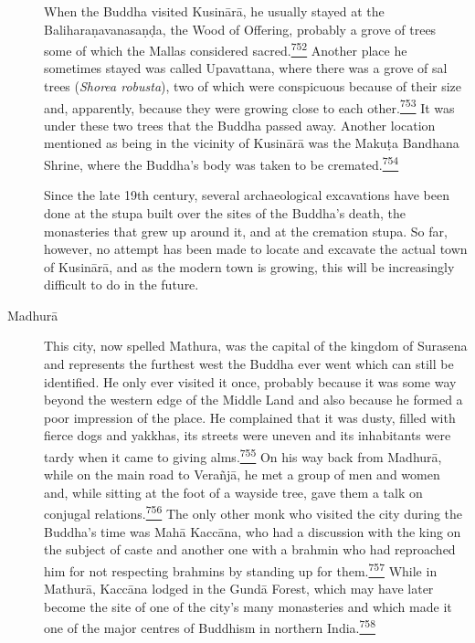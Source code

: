 \begin{description}
When the Buddha visited Kusinārā, he usually stayed at the
Baliharaṇavanasaṇḍa, the Wood of Offering, probably a grove of trees
some of which the Mallas considered
sacred.\label{footprints_split_019.html_fnref752}\hyperref[footprints_split_025.htmlux5cux23fn752]{\textsuperscript{752}}
Another place he sometimes stayed was called Upavattana, where there was
a grove of sal trees (\emph{Shorea robusta}), two of which were
conspicuous because of their size and, apparently, because they were
growing close to each
other.\label{footprints_split_019.html_fnref753}\hyperref[footprints_split_025.htmlux5cux23fn753]{\textsuperscript{753}}
It was under these two trees that the Buddha passed away. Another
location mentioned as being in the vicinity of Kusinārā was the Makuṭa
Bandhana Shrine, where the Buddha's body was taken to be
cremated.\label{footprints_split_019.html_fnref754}\hyperref[footprints_split_025.htmlux5cux23fn754]{\textsuperscript{754}}

Since the late 19{th} century, several archaeological excavations have
been done at the stupa built over the sites of the Buddha's death, the
monasteries that grew up around it, and at the cremation stupa. So far,
however, no attempt has been made to locate and excavate the actual town
of Kusinārā, and as the modern town is growing, this will be
increasingly difficult to do in the future.
\item[Madhurā]
This city, now spelled Mathura, was the capital of the kingdom of
Surasena and represents the furthest west the Buddha ever went which can
still be identified. He only ever visited it once, probably because it
was some way beyond the western edge of the Middle Land and also because
he formed a poor impression of the place. He complained that it was
dusty, filled with fierce dogs and yakkhas, its streets were uneven and
its inhabitants were tardy when it came to giving
alms.\label{footprints_split_019.html_fnref755}\hyperref[footprints_split_025.htmlux5cux23fn755]{\textsuperscript{755}}
On his way back from Madhurā, while on the main road to Verañjā, he met
a group of men and women and, while sitting at the foot of a wayside
tree, gave them a talk on conjugal
relations.\label{footprints_split_019.html_fnref756}\hyperref[footprints_split_025.htmlux5cux23fn756]{\textsuperscript{756}}
The only other monk who visited the city during the Buddha's time was
Mahā Kaccāna, who had a discussion with the king on the subject of caste
and another one with a brahmin who had reproached him for not respecting
brahmins by standing up for
them.\label{footprints_split_019.html_fnref757}\hyperref[footprints_split_025.htmlux5cux23fn757]{\textsuperscript{757}}
While in Mathurā, Kaccāna lodged in the Gundā Forest, which may have
later become the site of one of the city's many monasteries and which
made it one of the major centres of Buddhism in northern
India.\label{footprints_split_019.html_fnref758}\hyperref[footprints_split_025.htmlux5cux23fn758]{\textsuperscript{758}}


\end{description}

